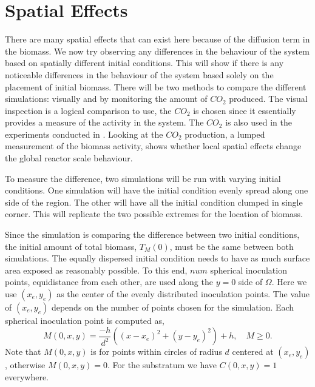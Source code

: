 \section{Spatial Effects}

There are many spatial effects that can exist here because of the diffusion term in the biomass.
We now try observing any differences in the behaviour of the system based on spatially different initial conditions.
This will show if there is any noticeable differences in the behaviour of the system based solely on the placement of initial biomass.
There will be two methods to compare the different simulations: visually and by monitoring the amount of $CO_2$ produced.
The visual inspection is a logical comparison to use, the $CO_2$ is chosen since it essentially provides a measure of the activity in the system.
The $CO_2$ is also used in the experiments conducted in \cite{dumitrache2014understanding}.
Looking at the $CO_2$ production, a lumped measurement of the biomass activity, shows whether local spatial effects change the global reactor scale behaviour.

To measure the difference, two simulations will be run with varying initial conditions.
One simulation will have the initial condition evenly spread along one side of the region.
The other will have all the initial condition clumped in single corner.
This will replicate the two possible extremes for the location of biomass.


Since the simulation is comparing the difference between two initial conditions, the initial amount of total biomass, $T_M(0)$, must be the same between both simulations.
The equally dispersed initial condition needs to have as much surface area exposed as reasonably possible.
To this end, $num$ spherical inoculation points, equidistance from each other, are used along the $y=0$ side of $\Omega$.
Here we use $(x_e, y_e)$ as the center of the evenly distributed inoculation points.
The value of $(x_e, y_e)$ depends on the number of points chosen for the simulation.
Each spherical inoculation point is computed as,
\begin{equation}
M(0,x,y) = \frac{-h}{d^2} ((x-x_e)^2 +(y-y_e)^2) + h, \quad M \ge 0.
\end{equation}
Note that $M(0,x,y)$ is for points within circles of radius $d$ centered at $(x_e, y_e)$, otherwise $M(0,x,y) = 0$.
For the substratum we have $C(0,x,y) = 1$ everywhere.

